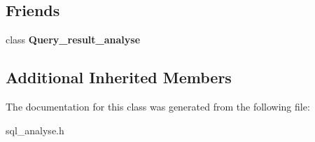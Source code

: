 \subsection*{Friends}
\begin{DoxyCompactItemize}
\item 
\mbox{\label{classfield__info_aec83d721292280e9b90504ee053343bb}} 
class {\bfseries Query\+\_\+result\+\_\+analyse}
\end{DoxyCompactItemize}
\subsection*{Additional Inherited Members}


The documentation for this class was generated from the following file\+:\begin{DoxyCompactItemize}
\item 
sql\+\_\+analyse.\+h\end{DoxyCompactItemize}
